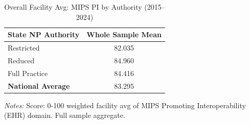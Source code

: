 \begin{table}[htbp]
    \centering
    \caption{Overall Facility Avg: MIPS PI by Authority (2015--2024)}
    \label{tab:fac_mips_pi_score_full}
    \vspace{0.2cm}
    \begin{tabular}{lc}
        \toprule
        \textbf{State NP Authority} & \textbf{Whole Sample Mean} \\
        \midrule
        Restricted & 82.035 \\
        Reduced & 84.960 \\
        Full Practice & 84.416 \\
        \midrule
        \textbf{National Average} & 83.295 \\
        \bottomrule
    \end{tabular}
    \vspace{0.1cm}
    \begin{minipage}{0.6\textwidth}
        \footnotesize \textit{Notes:} Score: 0-100 weighted facility avg of MIPS Promoting Interoperability (EHR) domain. Full sample aggregate.
    \end{minipage}
\end{table}